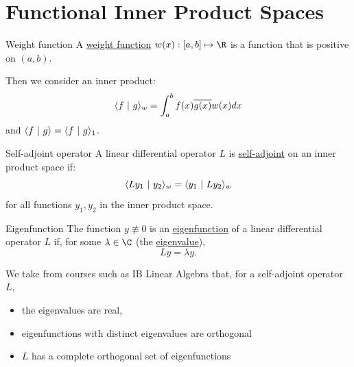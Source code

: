 \documentclass[../Main.tex]{subfiles}
\begin{document}
\section{Functional Inner Product Spaces}
\begin{definition}{Weight function}
    A \underline{weight function} $w(x) : [a, b] \mapsto \R$ is a function that is positive on $(a, b)$.
\end{definition}
Then we consider an inner product:
\begin{equation*}
    \langle f~\vert~g\rangle_w = \int_{a}^{b} f(x)\overline{g(x)} w(x) dx
\end{equation*}
and $\langle f~\vert~g\rangle = \langle f~\vert~g\rangle_1$.

\begin{definition}{Self-adjoint operator}
    A linear differential operator $L$ is \underline{self-adjoint} on an inner product space if:
    \begin{equation*}
        \langle Ly_1~\vert~y_2\rangle_w = \langle y_1~\vert~Ly_2\rangle_w
    \end{equation*}
    for all functions $y_1, y_2$ in the inner product space.
\end{definition}
\begin{definition}{Eigenfunction}
    The function $y \not\equiv 0$ is an \underline{eigenfunction} of a linear differential operator $L$ if, for some $\lambda \in \C$ (the \underline{eigenvalue}),
    \begin{equation*}
        Ly = \lambda y.
    \end{equation*}
\end{definition}
We take from courses such as IB Linear Algebra that, for a self-adjoint operator $L$,
\begin{itemize}
    \item the eigenvalues are real,
    \item eigenfunctions with distinct eigenvalues are orthogonal
    \item $L$ has a complete orthogonal set of eigenfunctions
\end{itemize}
\end{document}
